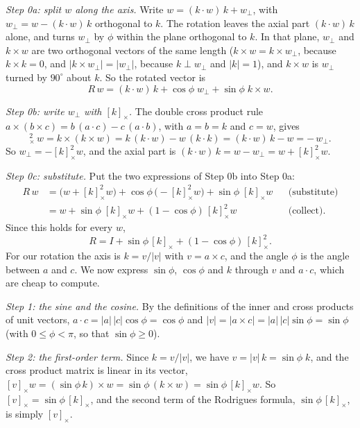 \emph{Step 0a: split $w$ along the axis.} Write $w = (k\cdot w)\,k + w_\perp$, with $w_\perp = w - (k\cdot w)\,k$ orthogonal to $k$. The rotation leaves the axial part $(k\cdot w)\,k$ alone, and turns $w_\perp$ by $\phi$ within the plane orthogonal to $k$. In that plane, $w_\perp$ and $k\times w$ are two orthogonal vectors of the same length ($k\times w = k\times w_\perp$, because $k\times k = 0$, and $|k\times w_\perp| = |w_\perp|$, because $k \perp w_\perp$ and $|k| = 1$), and $k\times w$ is $w_\perp$ turned by $90^\circ$ about $k$. So the rotated vector is
\begin{equation*}
R\,w = (k\cdot w)\,k + \cos\phi\; w_\perp + \sin\phi\; k\times w .
\end{equation*}

\emph{Step 0b: write $w_\perp$ with $[k]_\times$.} The double cross product rule $a\times(b\times c) = b\,(a\cdot c) - c\,(a\cdot b)$, with $a = b = k$ and $c = w$, gives
\begin{equation*}
[k]_\times^2\, w = k\times(k\times w) = k\,(k\cdot w) - w\,(k\cdot k) = (k\cdot w)\,k - w = -\,w_\perp .
\end{equation*}
So $w_\perp = -[k]_\times^2 w$, and the axial part is $(k\cdot w)\,k = w - w_\perp = w + [k]_\times^2 w$.

\emph{Step 0c: substitute.} Put the two expressions of Step 0b into Step 0a:
\begin{align*}
R\,w &= \big( w + [k]_\times^2 w \big) + \cos\phi\, \big( -[k]_\times^2 w \big) + \sin\phi\; [k]_\times w && \text{(substitute)} \\
&= w + \sin\phi\; [k]_\times w + (1 - \cos\phi)\, [k]_\times^2 w && \text{(collect)} .
\end{align*}
Since this holds for every $w$,
\begin{equation*}
R = I + \sin \phi\, [k]_\times + (1 - \cos \phi)\, [k]_\times^2 .
\end{equation*}
For our rotation the axis is $k = v/|v|$ with $v = a\times c$, and the angle $\phi$ is the angle between $a$ and $c$. We now express $\sin\phi$, $\cos\phi$ and $k$ through $v$ and $a\cdot c$, which are cheap to compute.

\emph{Step 1: the sine and the cosine.} By the definitions of the inner and cross products of unit vectors, $a \cdot c = |a|\,|c|\cos \phi = \cos\phi$ and $|v| = |a\times c| = |a|\,|c|\sin \phi = \sin\phi$ (with $0 \le \phi < \pi$, so that $\sin\phi \ge 0$).

\emph{Step 2: the first-order term.} Since $k = v/|v|$, we have $v = |v|\, k = \sin\phi\; k$, and the cross product matrix is linear in its vector, $[v]_\times w = (\sin\phi\, k)\times w = \sin\phi\, (k\times w) = \sin\phi\,[k]_\times w$. So $[v]_\times = \sin \phi\, [k]_\times$, and the second term of the Rodrigues formula, $\sin\phi\,[k]_\times$, is simply $[v]_\times$.

